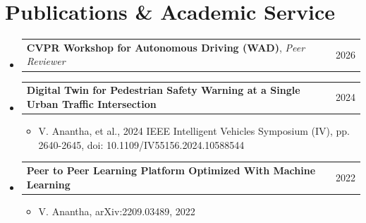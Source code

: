 \documentclass[letterpaper,11pt]{article}
\makeatletter
\newcommand{\resumeItem}[1]{
  \item\small{
    {#1 \vspace{-2pt}}
  }
}
\newcommand{\resumeProjectHeading}[2]{
    \item
    \begin{tabular*}{0.97\textwidth}{l@{\extracolsep{\fill}}r}
      \small#1 & #2 \\
    \end{tabular*}\vspace{-7pt}
}
\newcommand{\resumeSubHeadingListStart}{\begin{itemize}[leftmargin=0.15in, label={}]}
\newcommand{\resumeSubHeadingListEnd}{\end{itemize}}
\newcommand{\resumeItemListStart}{\begin{itemize}}
\newcommand{\resumeItemListEnd}{\end{itemize}\vspace{-5pt}}
\makeatother
\begin{document}
\section{Publications \& Academic Service}
    \resumeSubHeadingListStart
      \resumeProjectHeading
          {\textbf{CVPR Workshop for Autonomous Driving (WAD)}, \emph{Peer Reviewer}}{2026}
      \resumeProjectHeading
          {\textbf{Digital Twin for Pedestrian Safety Warning at a Single Urban Traffic Intersection}}{2024}
          \resumeItemListStart
            \resumeItem{V. Anantha, et al., 2024 IEEE Intelligent Vehicles Symposium (IV), pp. 2640-2645, doi: 10.1109/IV55156.2024.10588544}
          \resumeItemListEnd
      \resumeProjectHeading
          {\textbf{Peer to Peer Learning Platform Optimized With Machine Learning}}{2022}
          \resumeItemListStart
            \resumeItem{V. Anantha, arXiv:2209.03489, 2022}
          \resumeItemListEnd
    \resumeSubHeadingListEnd
\end{document}
